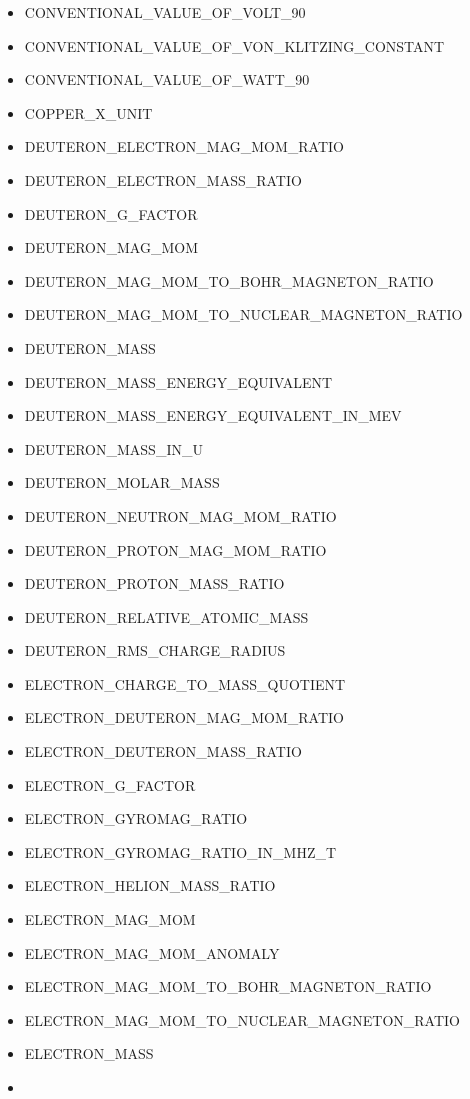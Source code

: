 \begin{itemize}
  CONVENTIONAL\_VALUE\_OF\_OHM\_90
\item
  CONVENTIONAL\_VALUE\_OF\_VOLT\_90
\item
  CONVENTIONAL\_VALUE\_OF\_VON\_KLITZING\_CONSTANT
\item
  CONVENTIONAL\_VALUE\_OF\_WATT\_90
\item
  COPPER\_X\_UNIT
\item
  DEUTERON\_ELECTRON\_MAG\_MOM\_RATIO
\item
  DEUTERON\_ELECTRON\_MASS\_RATIO
\item
  DEUTERON\_G\_FACTOR
\item
  DEUTERON\_MAG\_MOM
\item
  DEUTERON\_MAG\_MOM\_TO\_BOHR\_MAGNETON\_RATIO
\item
  DEUTERON\_MAG\_MOM\_TO\_NUCLEAR\_MAGNETON\_RATIO
\item
  DEUTERON\_MASS
\item
  DEUTERON\_MASS\_ENERGY\_EQUIVALENT
\item
  DEUTERON\_MASS\_ENERGY\_EQUIVALENT\_IN\_MEV
\item
  DEUTERON\_MASS\_IN\_U
\item
  DEUTERON\_MOLAR\_MASS
\item
  DEUTERON\_NEUTRON\_MAG\_MOM\_RATIO
\item
  DEUTERON\_PROTON\_MAG\_MOM\_RATIO
\item
  DEUTERON\_PROTON\_MASS\_RATIO
\item
  DEUTERON\_RELATIVE\_ATOMIC\_MASS
\item
  DEUTERON\_RMS\_CHARGE\_RADIUS
\item
  ELECTRON\_CHARGE\_TO\_MASS\_QUOTIENT
\item
  ELECTRON\_DEUTERON\_MAG\_MOM\_RATIO
\item
  ELECTRON\_DEUTERON\_MASS\_RATIO
\item
  ELECTRON\_G\_FACTOR
\item
  ELECTRON\_GYROMAG\_RATIO
\item
  ELECTRON\_GYROMAG\_RATIO\_IN\_MHZ\_T
\item
  ELECTRON\_HELION\_MASS\_RATIO
\item
  ELECTRON\_MAG\_MOM
\item
  ELECTRON\_MAG\_MOM\_ANOMALY
\item
  ELECTRON\_MAG\_MOM\_TO\_BOHR\_MAGNETON\_RATIO
\item
  ELECTRON\_MAG\_MOM\_TO\_NUCLEAR\_MAGNETON\_RATIO
\item
  ELECTRON\_MASS
\item

\end{itemize}
